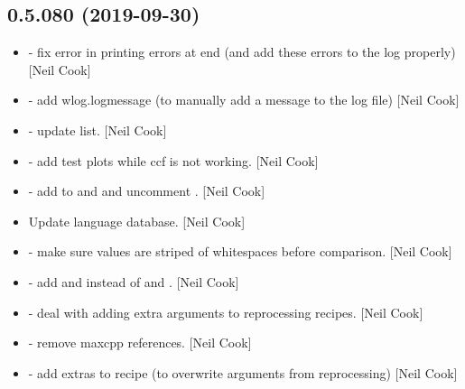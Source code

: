 \documentclass[a4paper,10pt,english]{report}
\begin{document}
\subsection{0.5.080 (2019-09-30)}
\label{\detokenize{misc/changelog:id62}}\begin{itemize}
\item {} 
 - fix error in printing errors at
end (and add these errors to the log properly) {[}Neil Cook{]}

\item {} 
 - add wlog.logmessage (to manually add a message
to the log file) {[}Neil Cook{]}

\item {} 
 - update list. {[}Neil Cook{]}

\item {} 
 - add test plots while ccf is
not working. {[}Neil Cook{]}

\item {} 
 - add  to 
and  and uncomment . {[}Neil Cook{]}

\item {} 
Update language database. {[}Neil Cook{]}

\item {} 
 - make sure values are striped of whitespaces
before comparison. {[}Neil Cook{]}

\item {} 
 - add  and
 instead of  and
. {[}Neil Cook{]}

\item {} 
 - deal with adding extra arguments
to reprocessing recipes. {[}Neil Cook{]}

\item {} 
 - remove maxcpp references. {[}Neil Cook{]}

\item {} 
 - add extras to recipe (to overwrite arguments
from reprocessing) {[}Neil Cook{]}


\end{itemize}
\end{document}
